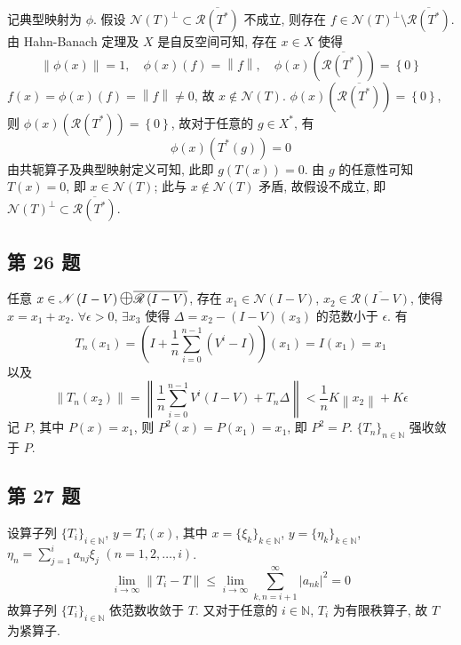\documentclass[../main.tex]{subfiles}
\begin{document}
记典型映射为 $\phi$.
假设 $\mathscr{N} \left( T \right)^\bot \subset \overline{\mathscr{R} \left( T^* \right)}$ 不成立, 则存在 $f \in \mathscr{N} \left( T \right)^\bot \setminus \overline{\mathscr{R} \left( T^* \right)}$.
由 Hahn-Banach 定理及 $X$ 是自反空间可知, 存在 $x \in X$ 使得
\[
    \left\| \phi \left( x \right) \right\| = 1
    , \quad
    \phi \left( x \right) \left( f \right) = \left\| f \right\|
    , \quad
    \phi \left( x \right) \left( \overline{\mathscr{R} \left( T^* \right)} \right) = \left\{ 0 \right\}
\]
$f \left( x \right) = \phi \left( x \right) \left( f \right) = \left\| f \right\| \neq 0$, 故 $x \notin \mathscr{N} \left( T \right)$.
$\phi \left( x \right) \left( \overline{\mathscr{R} \left( T^* \right)} \right) = \left\{ 0 \right\}$,
则 $\phi \left( x \right) \left( \mathscr{R} \left( T^* \right) \right) = \left\{ 0 \right\}$,
故对于任意的 $g \in X^*$, 有
\[
    \phi \left( x \right) \left( T^* \left( g \right) \right) = 0
\]
由共轭算子及典型映射定义可知, 此即 $g \left( T \left( x \right) \right) = 0$.
由 $g$ 的任意性可知 $T \left( x \right) = 0$, 即 $x \in \mathscr{N} \left( T \right)$;
此与 $x \notin \mathscr{N} \left( T \right)$ 矛盾, 故假设不成立,
即 $\mathscr{N} \left( T \right)^\bot \subset \overline{\mathscr{R} \left( T^* \right)}$.

\subsection{第 26 题}
任意 $x \in \mathscr{N} \left( I - V \right) \mathlarger{\mathlarger{\mathlarger{\oplus}}} \overline{\mathscr{R} \left( I - V \right)}$,
存在 $x_1 \in \mathscr{N} \left( I - V \right)$, $x_2 \in \overline{\mathscr{R} \left( I - V \right)}$, 使得 $x = x_1 + x_2$.
$\forall \epsilon > 0$, $\exists x_3$ 使得 $\Delta = x_2 - \left( I - V \right) \left( x_3 \right)$ 的范数小于 $\epsilon$.
有
\[
    T_n \left( x_1 \right)
    = \left( I + \frac{1}{n} \sum_{i = 0}^{n - 1} \left( V^{i} - I \right) \right) \left( x_1 \right)
    = I \left( x_1 \right)
    = x_1
\]
以及
\[
    \left\| T_n \left( x_2 \right) \right\|
    = \left\| \frac{1}{n} \sum_{i = 0}^{n - 1} V^i \left( I - V \right) + T_n \Delta \right\|
    < \frac{1}{n} K \left\| x_2 \right\| + K \epsilon
\]
记 $P$, 其中 $P \left( x \right) = x_1$, 则 $P^2 \left( x \right) = P \left( x_1 \right) = x_1$, 即 $P^2 = P$.
$\{ T_{n} \}_{n \in \mathbb{N}}$ 强收敛于 $P$.

\subsection{第 27 题}
设算子列 $\{ T_{i} \}_{i \in \mathbb{N}}$, $y = T_i \left( x \right)$,
其中 $x = \{ \xi_{k} \}_{k \in \mathbb{N}}$, $y = \{ \eta_{k} \}_{k \in \mathbb{N}}$, $\eta_n = \sum_{j = 1}^{i} a_{n j} \xi_j$ $(n = 1, 2, \dots , i)$.
\[
    \lim_{i \to \infty} \left\| T_i - T \right\|
    \leqslant \lim_{i \to \infty} \sum_{k, n = i + 1}^{\infty} \left| a_{n k} \right|^2
    = 0
\]
故算子列 $\{ T_{i} \}_{i \in \mathbb{N}}$ 依范数收敛于 $T$.
又对于任意的 $i \in \mathbb{N}$, $T_i$ 为有限秩算子, 故 $T$ 为紧算子.
\end{document}
